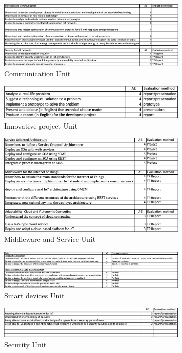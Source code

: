 \begin{figure}[!ht]
    \centering
    \includegraphics[width=0.8\textwidth]{image/Communication.png}
    \caption{Communication Unit}
    \label{fig:Communication}
\end{figure}
\begin{figure}[!ht]
    \centering
    \includegraphics[width=0.8\textwidth]{image/Innovativ project.png}
    \caption{Innovative project Unit}
    \label{fig:Innovativ project}
\end{figure}
\begin{figure}[!ht]
    \centering
    \includegraphics[width=0.8\textwidth]{image/Middleware and Service.png}
    \caption{Middleware and Service Unit}
    \label{fig:Middleware and Service}
\end{figure}
\begin{figure}[!ht]
    \centering
    \includegraphics[width=0.8\textwidth]{image/Smart devices.png}
    \caption{Smart devices Unit}
    \label{fig:Smart devices}
\end{figure}
\newpage
\begin{figure}[!ht]
    \centering
    \includegraphics[width=0.8\textwidth]{image/Security.png}
    \caption{Security Unit}
    \label{fig:Security}
\end{figure}


